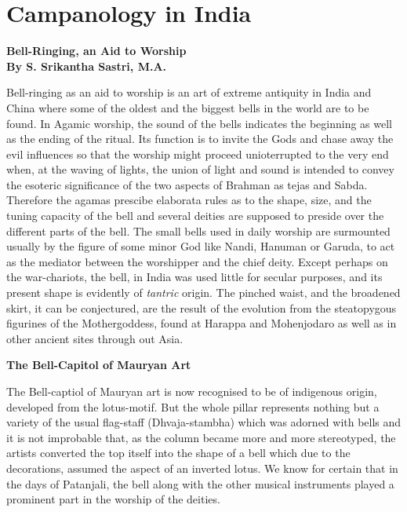 \documentclass{book}
\begin{document}
\chapter*{Campanology in India}

\begin{center}
\textbf{\LARGE Bell-Ringing, an Aid to Worship}\\

\medskip
\large{\textbf{By S. Srikantha Sastri, M.A.}}
\end{center}

Bell-ringing as an aid to worship is an art of extreme antiquity in
India and China where some of the oldest and the biggest bells in the
world are to be found. In Agamic worship, the sound of the bells
indicates the beginning as well as the ending of the ritual. Its
function is to invite the Gods and chase away the evil influences so
that the worship might proceed unioterrupted to the very end when, at
the waving of lights, the union of light and sound is intended to
convey the esoteric significance of the two aspects of Brahman as
tejas and Sabda. Therefore the agamas prescibe elaborata rules as to
the shape, size, and the tuning capacity of the bell and several
deities are supposed to preside over the different parts of the
bell. The small bells used in daily worship are surmounted usually by
the figure of some minor God like Nandi, Hanuman or Garuda, to act as
the mediator between the worshipper and the chief deity. Except
perhaps on the war-chariots, the bell, in India was used little for
secular purposes, and its present shape is evidently of
\textit{tantric} origin. The pinched waist, and the broadened skirt,
it can be conjectured, are the result of the evolution from the
steatopygous figurines of the Mothergoddess, found at Harappa and
Mohenjodaro as well as in other ancient sites through out Asia.

\begin{center}
\textbf{The Bell-Capitol of Mauryan Art}
\end{center}

The Bell-captiol of Mauryan art is now recognised to be of indigenous
origin, developed from the lotus-motif. But the whole pillar
represents nothing but a variety of the usual flag-staff
(Dhvaja-stambha) which was adorned with bells and it is not improbable
that, as the column became more and more stereotyped, the artists
converted the top itself into the shape of a bell which due to the
decorations, assumed the aspect of an inverted lotus. We know for
certain that in the days of Patanjali, the bell along with the other
musical instruments played a prominent part in the worship of the
deities.
\end{document}
